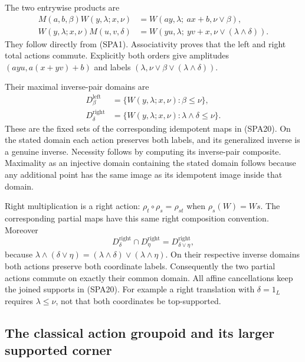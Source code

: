 The two entrywise products are
\begin{equation}\tag{SPA20}
\begin{aligned}
M(a,b,\beta)W(y,\lambda;x,\nu)
 &=W(ay,\lambda;\ ax+b,\nu\vee\beta),\\
W(y,\lambda;x,\nu)M(u,v,\delta)
 &=W(yu,\lambda;\ yv+x,\nu\vee(\lambda\wedge\delta)).
\end{aligned}
\end{equation}
They follow directly from (SPA1). Associativity proves
that the left and right total actions commute. Explicitly
both orders give amplitudes $(ayu,a(x+yv)+b)$ and labels
$(\lambda,\nu\vee\beta\vee(\lambda\wedge\delta))$.

Their maximal inverse-pair domains are
\begin{equation}\tag{SPA21}
\begin{aligned}
D^{\mathrm{left}}_\beta
 &=\{W(y,\lambda;x,\nu):\beta\le\nu\},\\
D^{\mathrm{right}}_\delta
 &=\{W(y,\lambda;x,\nu):\lambda\wedge\delta\le\nu\}.
\end{aligned}
\end{equation}
These are the fixed sets of the corresponding idempotent
maps in (SPA20). On the stated domain each action preserves
both labels, and its generalized inverse is a genuine
inverse. Necessity follows by computing its inverse-pair
composite. Maximality as an injective domain containing the
stated domain follows because any additional point has the
same image as its idempotent image inside that domain.

Right multiplication is a right action:
$\rho_t\circ\rho_s=\rho_{st}$ when $\rho_s(W)=Ws$.
The corresponding partial maps have this same right
composition convention. Moreover
\[
D^{\mathrm{right}}_\delta\cap D^{\mathrm{right}}_\eta
=D^{\mathrm{right}}_{\delta\vee\eta},
\]
because $\lambda\wedge(\delta\vee\eta)
=(\lambda\wedge\delta)\vee(\lambda\wedge\eta)$.
On their respective inverse domains both actions preserve
both coordinate labels. Consequently the two partial
actions commute on exactly their common domain.
All affine cancellations keep the joined supports in (SPA20).
For example a right translation with $\delta=1_L$ requires
$\lambda\le\nu$, not that both coordinates be top-supported.

\subsection{The classical action groupoid and its larger supported corner}

